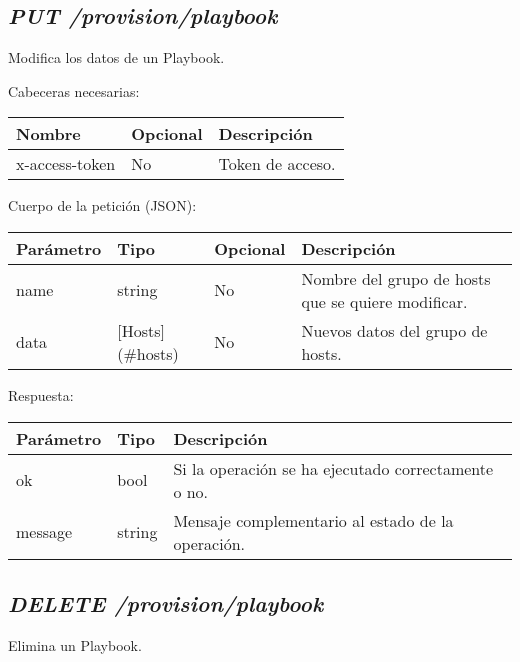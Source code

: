 	
	\subsection{\textit{PUT /provision/playbook}}
		Modifica los datos de un Playbook.
		
		Cabeceras necesarias:
		\begin{table}[h!]
			\centering
	\begin{adjustbox}{max width=\textwidth}
			\begin{tabular}{|l|l|l|}
				\hline
				Nombre & Opcional & Descripción \\ \hline
				x-access-token & No & Token de acceso. \\ \hline
			\end{tabular}
\end{adjustbox}
		\end{table}
		
		Cuerpo de la petición (JSON):
		\begin{table}[!h]
			\centering
	\begin{adjustbox}{max width=\textwidth}
			\begin{tabular}{|l|l|l|l|}
				\hline
				Parámetro & Tipo & Opcional & Descripción \\ \hline
				name & string & No & Nombre del grupo de hosts que se quiere modificar. \\ \hline
				data & [Hosts](\#hosts) & No & Nuevos datos del grupo de hosts. \\ \hline
			\end{tabular}
\end{adjustbox}
		\end{table}
		
		
		Respuesta:
		\begin{table}[!h]
			\centering
	\begin{adjustbox}{max width=\textwidth}
			\begin{tabular}{|l|l|l|}
				\hline
				Parámetro & Tipo & Descripción \\ \hline
				ok & bool & Si la operación se ha ejecutado correctamente o no. \\ \hline
				message & string & Mensaje complementario al estado de la operación. \\ \hline
			\end{tabular}
\end{adjustbox}
		\end{table}
	
	\subsection{\textit{DELETE /provision/playbook}}
		Elimina un Playbook.
		
